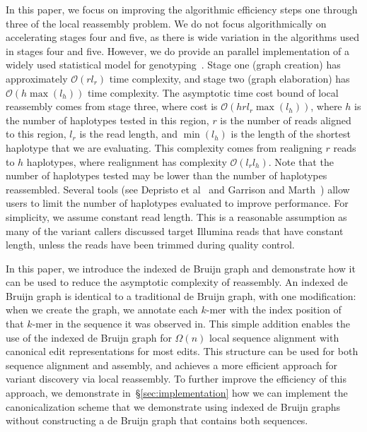 \documentclass[phd]{ucbthesis}
\begin{document}
In this paper, we focus on improving the algorithmic efficiency steps one through three of the local reassembly problem.
We do not focus algorithmically on accelerating stages four and five, as there is wide
variation in the algorithms used in stages four and five. However, we do provide an parallel
implementation of a widely used statistical model for genotyping~\cite{li11}. Stage one (graph
creation) has approximately $\mathcal{O}(r l_r)$ time complexity, and stage two (graph elaboration) has
$\mathcal{O}(h \max(l_h))$ time complexity.
The asymptotic time cost bound of local reassembly comes from stage three, where cost is $\mathcal{O}(h r l_r
\max(l_h))$, where $h$ is the number of haplotypes tested in this region, $r$ is the number of reads aligned to this region, $l_r$ is the read length,
and $\min(l_h)$ is the length of the
shortest haplotype that we are evaluating. This complexity comes from realigning $r$ reads to $h$
haplotypes, where realignment has complexity $\mathcal{O}(l_r l_h)$. Note that the number of
haplotypes tested may be lower than the number of haplotypes reassembled. Several tools
(see Depristo et al~\cite{depristo11} and Garrison and Marth~\cite{garrison12}) allow users to limit the number of haplotypes evaluated to improve
performance. For simplicity, we assume constant read length. This is a reasonable assumption as many of the variant
callers discussed target Illumina reads that have constant length, unless the reads have been trimmed
during quality control.

In this paper, we introduce the indexed de Bruijn graph and demonstrate how it can be used to
reduce the asymptotic complexity of reassembly. An indexed de Bruijn graph is identical to a
traditional de Bruijn graph, with one modification: when we create the graph, we annotate each
$k$-mer with the index position of that $k$-mer in the sequence it was observed in. This simple addition
enables the use of the indexed de Bruijn graph for $\Omega(n)$ local sequence alignment with
canonical edit representations for most edits. This structure can be used for both sequence alignment and
assembly, and achieves a more efficient approach for variant discovery via local reassembly.
To further improve the efficiency of this approach, we demonstrate in~\S\ref{sec:implementation}
how we can implement the canonicalization scheme that we demonstrate using indexed de Bruijn
graphs without constructing a de Bruijn graph that contains both sequences.
\end{document}
